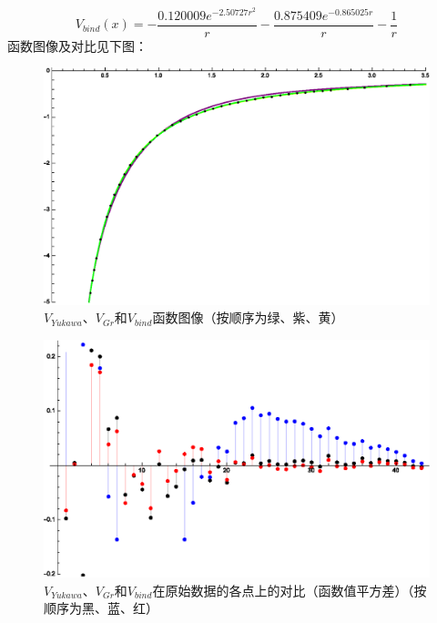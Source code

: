 \documentclass[hyperref,cs4size,titlepage,twoside]{ctexart}
\begin{document}
\begin{equation}\label{bind}
  V_{bind}(x)=-\frac{0.120009 e^{-2.50727 r^2}}{r}-\frac{0.875409 e^{-0.865025 r}}{r}-\frac{1}{r}
\end{equation}
函数图像及对比见下图：
\begin{figure}[!htbp]
  \centering
  \includegraphics[width=5.2in]{Test_BindingEnergy_FitOtherwise2.eps}
  \caption{$V_{Yukawa}$、$V_{Gr}$和$V_{bind}$函数图像（按顺序为绿、紫、黄）}
\end{figure}
\clearpage
\begin{figure}[!htbp]
  \centering
  \includegraphics[width=5.2in]{Test_BindingEnergy_FitOtherwise3.eps}
  \caption{$V_{Yukawa}$、$V_{Gr}$和$V_{bind}$在原始数据的各点上的对比（函数值平方差）（按顺序为黑、蓝、红）}
\end{figure}
\end{document}
